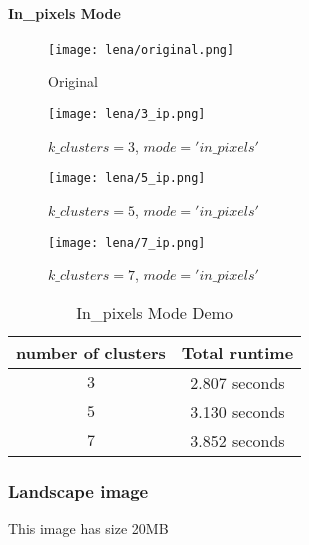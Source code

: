 \paragraph{In\_pixels Mode}
\quad 

\begin{figure}[htbp]
    \centering
    \begin{minipage}{0.45\textwidth}
        \centering
        \texttt{[image: lena/original.png]}
        \caption{Original}
    \end{minipage}\hfill
    \begin{minipage}{0.45\textwidth}
        \centering
        \texttt{[image: lena/3\_ip.png]}
        \caption{$k\_clusters = 3$, $mode = 'in\_pixels'$}
    \end{minipage}
    
    \vspace{0.5cm} %
    
    \begin{minipage}{0.45\textwidth}
        \centering
        \texttt{[image: lena/5\_ip.png]}
        \caption{$k\_clusters = 5$, $mode = 'in\_pixels'$}
    \end{minipage}\hfill
    \begin{minipage}{0.45\textwidth}
        \centering
        \texttt{[image: lena/7\_ip.png]}
        \caption{$k\_clusters = 7$, $mode = 'in\_pixels'$}
    \end{minipage}
\end{figure}

\begin{table}[htbp]
    \centering
    \begin{tabular}{|c|c|}
        \hline
        \textbf{number of clusters} & \textbf{Total runtime} \\
        \hline
        $ 3$ & 2.807 seconds \\
        \hline
        $5$ & 3.130 seconds \\
        \hline
        $7$ & 3.852 seconds \\
        \hline
    \end{tabular}
    \caption{In\_pixels Mode Demo}
    \label{tab:in_pixels_mode}
\end{table}
\clearpage %
\subsubsection{Landscape image}
\quad This image has size 20MB
